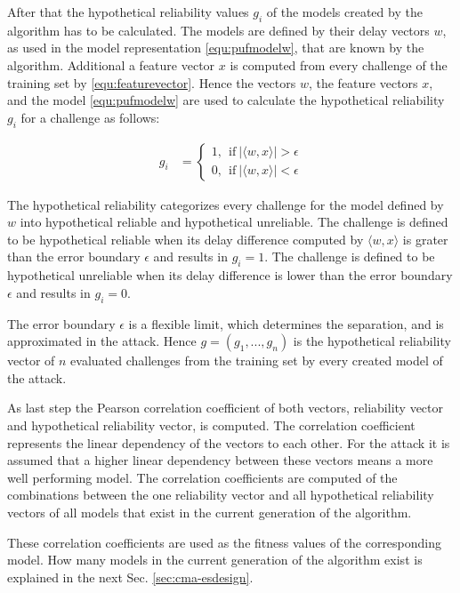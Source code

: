After that the hypothetical reliability values $g_i$ of the models created by the algorithm has to be calculated.
The models are defined by their delay vectors $w$, as used in the \apuf model representation \ref{equ:pufmodelw}, that are known by the algorithm. %
Additional a feature vector $x$ is computed from every challenge of the training set by \ref{equ:featurevector}.
Hence the vectors $w$, the feature vectors $x$, and the \apuf model \ref{equ:pufmodelw} are used to calculate the hypothetical reliability $g_i$ for a challenge as follows:

\begin{equation}
\begin{aligned}
g_i &=
\begin{cases}
1,\ \ \text{if}\ |\langle w, x \rangle| > \epsilon\\
0,\ \ \text{if}\ |\langle w, x \rangle| < \epsilon \label{equ:hypotheticalreliability}
\end{cases}
\end{aligned}
\end{equation}

The hypothetical reliability categorizes every challenge for the model defined by $w$ into hypothetical reliable and hypothetical unreliable. %
The challenge is defined to be hypothetical reliable when its delay difference computed by $\langle w, x \rangle$ is grater than the error boundary $\epsilon$ and results in $g_i = 1$.
The challenge is defined to be hypothetical unreliable when its delay difference is lower than the error boundary $\epsilon$ and results in $g_i = 0$. %

The error boundary $\epsilon$ is a flexible limit, which determines the separation, and is approximated in the attack.
Hence $g = (g_1, ..., g_n)$ is the hypothetical reliability vector of $n$ evaluated challenges from the training set by every created model of the attack.

As last step the Pearson correlation coefficient of both vectors, reliability vector and hypothetical reliability vector, is computed.
The correlation coefficient represents the linear dependency of the vectors to each other.
For the attack it is assumed that a higher linear dependency between these vectors means a more well performing model. %
The correlation coefficients are computed of the combinations between the one reliability vector and all hypothetical reliability vectors of all models that exist in the current generation of the algorithm.

These correlation coefficients are used as the fitness values of the corresponding model.
How many models in the current generation of the algorithm exist is explained in the next Sec. \ref{sec:cma-esdesign}.

